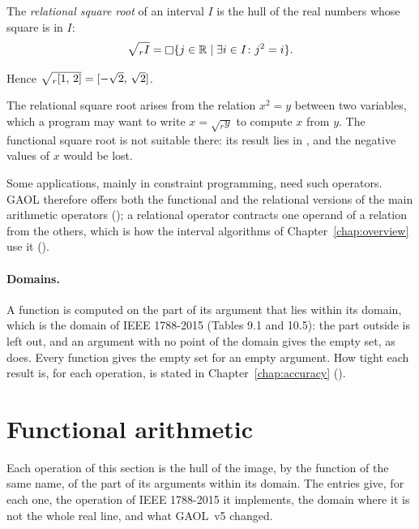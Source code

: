 \documentclass[12pt,a4paper,twoside,openright]{book}
\begin{document}
\begin{Def}\label{def:arithmetic-relational-sqrt}
The \emph{relational square root} of an interval $I$ is the hull of the real
numbers whose square is in $I$:
\begin{equation*}
\sqrt{_rI}=\mathop{\Box} \{j\in\mathbb{R}\mid\exists i\in I\colon j^2=i\}.
\end{equation*}
\end{Def}

\noindent Hence $\sqrt{_r[1,\,2]}=[-\sqrt{2},\,\sqrt{2}]$.

\begin{Ex}
The relational square root arises from the relation $x^2=y$ between two
variables, which a program may want to write $x=\sqrt{_ry}$ to compute $x$
from $y$. The functional square root is not suitable there: its result lies
in , and the negative values of $x$ would be lost.
\end{Ex}

Some applications, mainly in constraint programming, need such operators.
GAOL therefore offers both the functional and the relational versions of the
main arithmetic operators (); a relational
operator contracts one operand of a relation from the others, which is how
the interval algorithms of Chapter~\ref{chap:overview} use it
().

\paragraph{Domains.}
A function is computed on the part of its argument that lies within its
domain, which is the domain of IEEE 1788-2015 (Tables 9.1 and 10.5): the
part outside is left out, and an argument with no point of the domain gives
the empty set, as  does.\newinvfive{} Every function
gives the empty set for an empty argument. How tight each result is, for each
operation, is stated in Chapter~\ref{chap:accuracy}
().
%

\section{Functional arithmetic}\label{sec:arithmetic-functional}

Each operation of this section is the hull of the image, by the function of
the same name, of the part of its arguments within its domain. The entries
give, for each one, the operation of IEEE 1788-2015 it implements, the
domain where it is not the whole real line, and what GAOL~v5 changed.
\end{document}
